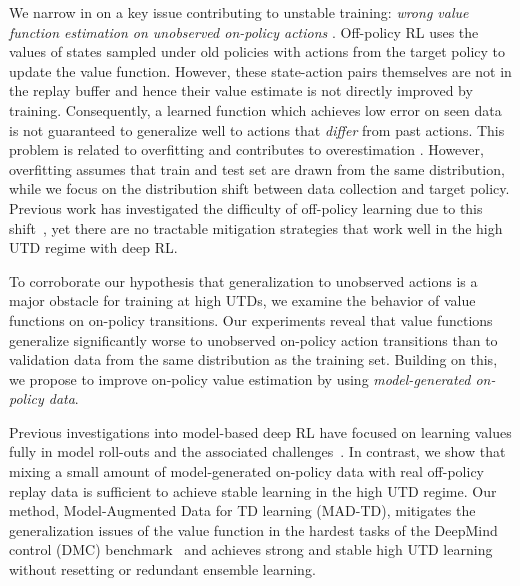 We narrow in on a key issue contributing to unstable training: \emph{wrong value function estimation on unobserved on-policy actions} \parencite{thrun1993issues,tsitsiklis1996analysis}.
Off-policy RL uses the values of states sampled under old policies with actions from the target policy to update the value function.
However, these state-action pairs themselves are not in the replay buffer and hence their value estimate is not directly improved by training.
Consequently, a learned function which achieves low error on seen data is not guaranteed to generalize well to actions that \emph{differ} from past actions.
This problem is related to overfitting \parencite{li2023efficient} and contributes to overestimation \parencite{thrun1993issues,hasselt2010double,fujimoto2018addressing}.
However, overfitting assumes that train and test set are drawn from the same distribution, while we focus on the distribution shift between data collection and target policy.
Previous work has investigated the difficulty of off-policy learning due to this shift~\parencite{maei2009convergent,sutton2016emphatic,hasselt2010double,fujimoto2018addressing}, yet there are no tractable mitigation strategies that work well in the high UTD regime with deep RL.

To corroborate our hypothesis that generalization to unobserved actions is a major obstacle for training at high UTDs, we examine the behavior of value functions on on-policy transitions. 
Our experiments reveal that value functions generalize significantly worse to unobserved on-policy action transitions than to validation data from the same distribution as the training set.
Building on this, we propose to improve on-policy value estimation by using \emph{model-generated on-policy data}.

Previous investigations into model-based deep RL have focused on learning values fully in model roll-outs \parencite{buckman2018sample,janner2019mbpo,Hafner2020Dream,ghugare2023simplifying} and the associated challenges~\parencite{zhao2023simplified,hansen2024tdmpc}.
In contrast, we show that mixing a small amount of model-generated on-policy data with real off-policy replay data is sufficient to achieve stable learning in the high UTD regime.
Our method, Model-Augmented Data for TD learning (MAD-TD), mitigates the generalization issues of the value function in the hardest tasks of the DeepMind control (DMC) benchmark~\parencite{tunyasuvunakool2020dmcontrol} and achieves strong and stable high UTD learning without resetting or redundant ensemble learning. 

